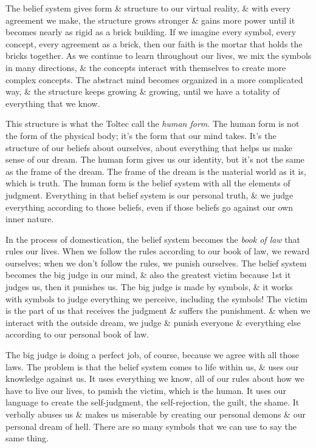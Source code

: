 \documentclass{article}
\numberwithin{equation}{section}
\begin{document}
The belief system gives form \& structure to our virtual reality, \& with every agreement we make, the structure grows stronger \& gains more power until it becomes nearly as rigid as a brick building. If we imagine every symbol, every concept, every agreement as a brick, then our faith is the mortar that holds the bricks together. As we continue to learn throughout our lives, we mix the symbols in many directions, \& the concepts interact with themselves to create more complex concepts. The abstract mind becomes organized in a more complicated way, \& the structure keeps growing \& growing, until we have a totality of everything that we know.

This structure is what the Toltec call the \textit{human form}. The human form is not the form of the physical body; it's the form that our mind takes. It's the structure of our beliefs about ourselves, about everything that helps us make sense of our dream. The human form gives us our identity, but it's not the same as the frame of the dream. The frame of the dream is the material world as it is, which is truth. The human form is the belief system with all the elements of judgment. Everything in that belief system is our personal truth, \& we judge everything according to those beliefs, even if those beliefs go against our own inner nature.

In the process of domestication, the belief system becomes the \textit{book of law} that rules our lives. When we follow the rules according to our book of law, we reward ourselves; when we don't follow the rules, we punish ourselves. The belief system becomes the big judge in our mind, \& also the greatest victim because 1st it judges us, then it punishes us. The big judge is made by symbols, \& it works with symbols to judge everything we perceive, including the symbols! The victim is the part of us that receives the judgment \& suffers the punishment. \& when we interact with the outside dream, we judge \& punish everyone \& everything else according to our personal book of law.

The big judge is doing a perfect job, of course, because we agree with all those laws. The problem is that the belief system comes to life within us, \& uses our knowledge against us. It uses everything we know, all of our rules about how we have to live our lives, to punish the victim, which is the human. It uses our language to create the self-judgment, the self-rejection, the guilt, the shame. It verbally abuses us \& makes us miserable by creating our personal demons \& our personal dream of hell. There are so many symbols that we can use to say the same thing.
\end{document}
